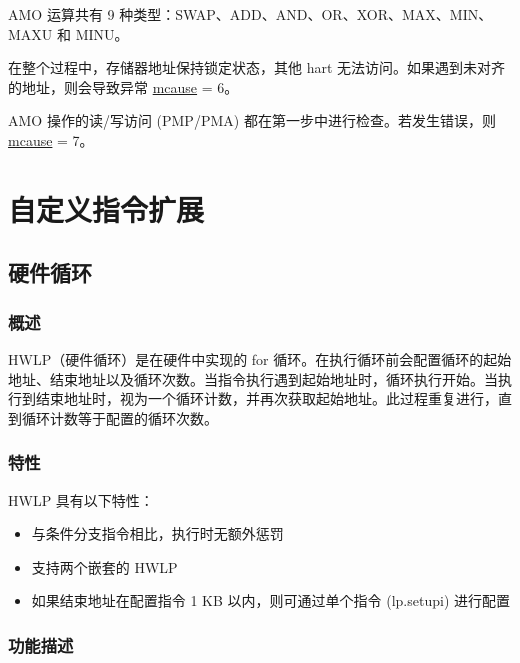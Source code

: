 \documentclass[main\_\_CN.tex]{subfiles}
\begin{document}
AMO 运算共有 9 种类型：SWAP、ADD、AND、OR、XOR、MAX、MIN、MAXU 和 MINU。

在整个过程中，存储器地址保持锁定状态，其他 hart 无法访问。如果遇到未对齐的地址，则会导致异常 \hyperref[regdesc:MCAUSE]{mcause} = 6。

AMO 操作的读/写访问 (PMP/PMA) 都在第一步中进行检查。若发生错误，则 \hyperref[regdesc:MCAUSE]{mcause} = 7。

\newpage
\section{自定义指令扩展}

\subsection{硬件循环}
\label{sec:riscvcpu-hwloop}

\subsubsection{概述}
\label{sec:riscvcpu-hwloop-overview}

HWLP（硬件循环）是在硬件中实现的 for 循环。在执行循环前会配置循环的起始地址、结束地址以及循环次数。当指令执行遇到起始地址时，循环执行开始。当执行到结束地址时，视为一个循环计数，并再次获取起始地址。此过程重复进行，直到循环计数等于配置的循环次数。

\subsubsection{特性}
\label{sec:riscvcpu-hwloop-feature}

HWLP 具有以下特性：

\begin{itemize}
\item 与条件分支指令相比，执行时无额外惩罚
\item 支持两个嵌套的 HWLP
\item 如果结束地址在配置指令 1 KB 以内，则可通过单个指令 (lp.setupi) 进行配置
\end{itemize}

\subsubsection{功能描述}
\label{sec:riscvcpu-hwloop-func-descr}
\end{document}
